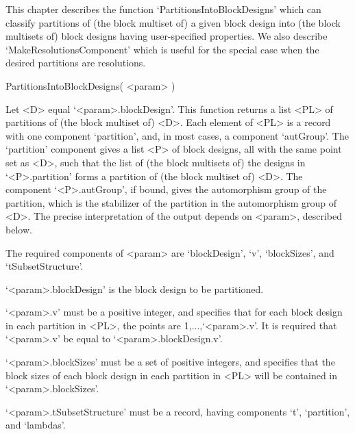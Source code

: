 %
%
%
%
\def\GRAPE{\sf GRAPE}
\def\DESIGN{\sf DESIGN}
\def\nauty{\it nauty}
\def\Aut{{\rm Aut}\,} 


This chapter describes the function `PartitionsIntoBlockDesigns' which can
classify partitions of (the block multiset of) a given block design into
(the block multisets of) block designs having user-specified properties.
We also describe `MakeResolutionsComponent' which is useful for the
special case when the desired partitions are resolutions.


\>PartitionsIntoBlockDesigns( <param> )

Let <D> equal `<param>.blockDesign'.  This function returns a list <PL>
of partitions of (the block multiset of) <D>.  Each element of <PL> is a
record with one component `partition', and, in most cases, a component
`autGroup'.  The `partition' component gives a list <P> of block designs,
all with the same point set as <D>, such that the list of (the block
multisets of) the designs in `<P>.partition' forms a partition of (the
block multiset of) <D>. The component `<P>.autGroup', if bound, gives
the automorphism group of the partition, which is the stabilizer of the
partition in the automorphism group of <D>.  The precise interpretation
of the output depends on <param>, described below.

The required components of <param> are `blockDesign', `v', `blockSizes',
and `tSubsetStructure'.

`<param>.blockDesign' is the block design to be partitioned.

`<param>.v' must be a positive integer, and specifies that for each block
design in each partition in <PL>, the points are 1,...,`<param>.v'.
It is required that `<param>.v' be equal to `<param>.blockDesign.v'.

`<param>.blockSizes' must be a set of positive integers, and specifies
that the block sizes of each block design in each partition in <PL>
will be contained in `<param>.blockSizes'.

`<param>.tSubsetStructure' must be a record, having
components `t', `partition', and `lambdas'. 

